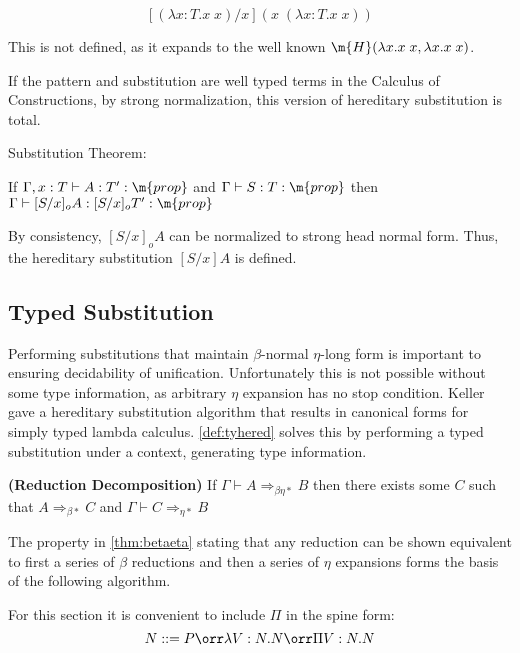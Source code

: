 \[
[(\lambda x : T . x\; x) / x ] ( x \; (\lambda x : T. x\; x) )
\]

This is not defined, as it expands to the well known $\m{H}(\lambda x . x \; x , \lambda x . x \; x)$.

If the pattern and substitution are well typed terms in the Calculus of Constructions, by 
strong normalization, this version of hereditary substitution is total.


\begin{theorem} Substitution Theorem:

If $\Gamma,x : T \vdash A : T' : \m{prop}$  and $\Gamma \vdash S : T : \m{prop}$ then
$ \Gamma \vdash [S/x]_o A : [S/x]_o T' : \m{prop}$
\end{theorem}

By consistency, $[S/x]_o A $ can be normalized to strong head normal form.  Thus, the 
hereditary substitution $[S/x] A$ is defined.



\subsection{Typed Substitution}

Performing substitutions that maintain $\beta$-normal $\eta$-long
form is important to ensuring decidability of unification.  
Unfortunately this is not possible without some type information, 
as arbitrary $\eta$ expansion has no stop condition.
Keller \citep{keller2010normalization} gave a hereditary substitution algorithm
that results in canonical forms for simply typed lambda calculus. 
\ref{def:tyhered} solves this by performing a typed substitution under a context, 
generating type information.

\begin{theorem}
\textbf{(Reduction Decomposition)}
If $\Gamma \vdash A \Rightarrow_{\beta\eta*} B$ then there exists some $C$ such that
$A \Rightarrow_{\beta*} C$ and $\Gamma \vdash C \Rightarrow_{\eta*} B$

\label{thm:betaeta}
\end{theorem}

The property in \ref{thm:betaeta} stating that any reduction can be 
shown equivalent to first a series of $\beta$ reductions and then a series of
$\eta$ expansions forms the basis of the following algorithm.

For this section it is convenient to include $\Pi$ in the spine form: 
\[
N ::= P 
\orr \lambda V : N . N 
\orr \Pi V : N . N 
\]


